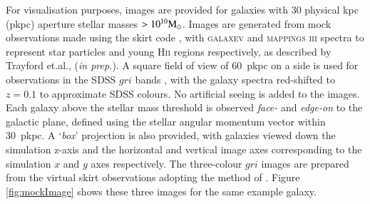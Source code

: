 For visualisation purposes, images are provided for galaxies with 30 physical
kpc (pkpc) aperture stellar masses $> 10^{10} {\rm M}_\odot$. Images are
generated from mock observations made using the {\sc skirt} code \citep{Baes03,
  Camps15}, with \textsc{galaxev} \citep{BC03} and \textsc{mappings iii}
\citep{Groves08} spectra to represent star particles and young H\textsc{ii}
regions respectively, as described by Trayford et.al., (\textit{in prep.}). A
square field of view of 60~pkpc on a side is used for observations in the SDSS
$gri$ bands \citep{SDSSfilters}, with the galaxy spectra red-shifted to $z =
0.1$ to approximate SDSS colours. No artificial seeing is added to the
images. Each galaxy above the stellar mass threshold is observed \textit{face-}
and \textit{edge-on} to the galactic plane, defined using the stellar angular
momentum vector within 30~pkpc. A `\textit{box}' projection is also provided,
with galaxies viewed down the simulation z-axis and the horizontal and vertical
image axes corresponding to the simulation $x$ and $y$ axes respectively. The
three-colour $gri$ images are prepared from the virtual {\sc skirt} observations
adopting the method of \citet{Lupton04}. Figure \ref{fig:mockImage} shows these
three images for the same example galaxy.
